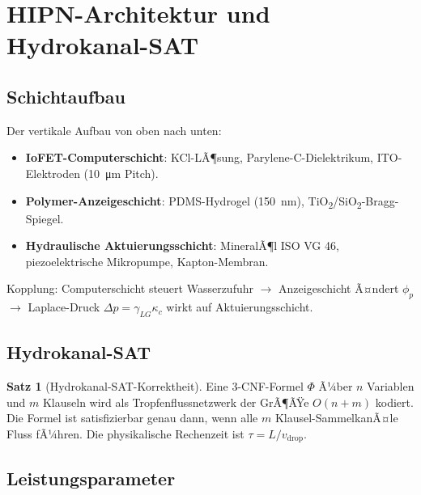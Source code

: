 ﻿\documentclass[a4paper,12pt]{scrreprt}
\theoremstyle{definition}
\newtheorem{satz}{Satz}[section]
\begin{document}
\section{HIPN-Architektur und Hydrokanal-SAT}

\subsection{Schichtaufbau}

Der vertikale Aufbau von oben nach unten:
\begin{itemize}
  \item \textbf{IoFET-Computerschicht}: KCl-LÃ¶sung, Parylene-C-Dielektrikum,
    ITO-Elektroden (\SI{10}{\micro m} Pitch).
  \item \textbf{Polymer-Anzeigeschicht}: PDMS-Hydrogel (\SI{150}{nm}),
    TiO\textsubscript{2}/SiO\textsubscript{2}-Bragg-Spiegel.
  \item \textbf{Hydraulische Aktuierungsschicht}: MineralÃ¶l ISO VG 46,
    piezoelektrische Mikropumpe, Kapton-Membran.
\end{itemize}
Kopplung: Computerschicht steuert Wasserzufuhr $\to$ Anzeigeschicht
Ã¤ndert $\phi_p$ $\to$ Laplace-Druck $\Delta p = \gamma_{LG}\kappa_c$
wirkt auf Aktuierungsschicht.

\subsection{Hydrokanal-SAT}

\begin{satz}[Hydrokanal-SAT-Korrektheit]
  Eine 3-CNF-Formel $\Phi$ Ã¼ber $n$ Variablen und $m$ Klauseln wird als
  Tropfenflussnetzwerk der GrÃ¶ÃŸe $O(n+m)$ kodiert. Die Formel ist
  satisfizierbar genau dann, wenn alle $m$ Klausel-SammelkanÃ¤le Fluss
  fÃ¼hren. Die physikalische Rechenzeit ist $\tau = L/v_{\mathrm{drop}}$.
\end{satz}

\subsection{Leistungsparameter}
\end{document}

